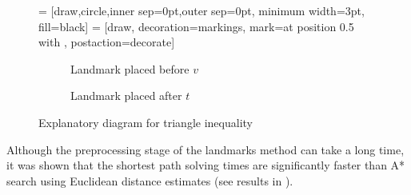 \begin{figure}[!ht]
    \centering
     = [draw,circle,inner sep=0pt,outer sep=0pt, minimum width=3pt, fill=black]
     = [draw, decoration={markings, mark=at position 0.5 with {\arrow{>}}}, postaction={decorate}]
    \begin{subfigure}[t]{.4\textwidth}
        \centering
        \caption{Landmark placed before $v$}
    \end{subfigure}
    \hspace{1cm}
    \begin{subfigure}[t]{.4\textwidth}
        \centering
        \caption{Landmark placed after $t$}
    \end{subfigure}
    \caption{Explanatory diagram for triangle inequality}
    \label{fig:landmarks}
\end{figure}

Although the preprocessing stage of the landmarks method can take a long time,
it was shown that the shortest path solving times are significantly faster than A* search using Euclidean distance estimates (see results in \citet{GoldbergLandmarks}).

\begin{comment}
The landmarks method and similar preprocessing techniques have a few drawbacks that need to be considered.
The first drawback is that the preprocessing time may be longer than the actual shortest path solving time,
so combined running time may take longer.
This is shown in \citet{GoldbergEPP},
where a network with more than a million nodes takes 4 minutes to preprocess while the 
\todo[inline]{you'd only do this once for 0-flows times though? And they are only a few SP trees - need to check with Goldberg's results}
\end{comment}

